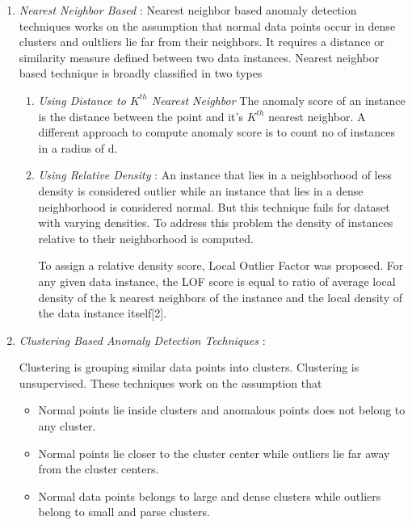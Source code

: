 \begin{enumerate}
	\item \textit {Nearest Neighbor Based } : Nearest neighbor based anomaly detection techniques works on the assumption that normal data points occur in dense clusters and oultliers lie far from their neighbors. It requires a distance or similarity
	measure defined between two data instances. Nearest neighbor based technique is broadly classified in two types
	
	\begin{enumerate}
		\item 
		\textit{Using Distance to $K^{th}$  Nearest Neighbor}
		The anomaly score of an instance is the distance between the point and it's $K^{th}$ nearest neighbor. A different approach to compute anomaly score is to count no of instances in a radius of d. 
		
		\item 
		\textit{Using Relative Density} : An instance that lies in a neighborhood of less density is considered outlier while an instance that lies in a dense neighborhood is considered normal. But this technique fails for dataset with varying densities. To address this problem the density of instances relative to their neighborhood is computed.
		
		\par To assign a relative density score, Local Outlier Factor was proposed. For any given data instance, the LOF score is equal to
		ratio of average local density of the k nearest neighbors of the instance and the local
		density of the data instance itself[2].
		
	\end{enumerate}



\item \textit{Clustering Based Anomaly Detection Techniques} : 

Clustering is grouping similar data points into clusters. Clustering is unsupervised. These techniques work on the assumption that
\begin{itemize}
	\item Normal points lie inside clusters and anomalous points does not belong to any cluster.
	
	\item Normal points lie closer to the cluster center while outliers lie far away from the cluster centers.
	
	\item Normal data points belongs to large and dense clusters while outliers belong to small and parse clusters.
\end{itemize} 

	

\end{enumerate}




